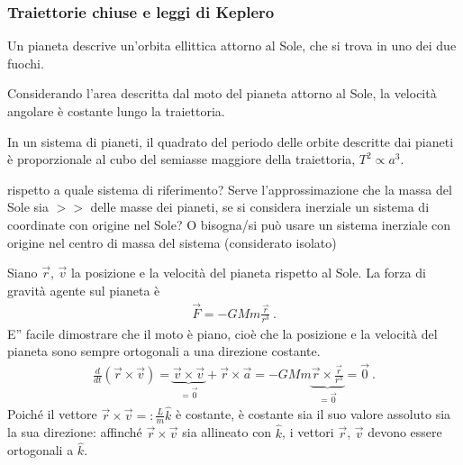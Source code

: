 \documentclass[letterpaper,10pt,italian]{jupyterBook}
\begin{document}
\subsubsection{Traiettorie chiuse e leggi di Keplero}
\label{\detokenize{ch/mechanics/dynamics-motion-gravitation:traiettorie-chiuse-e-leggi-di-keplero}}
\sphinxAtStartPar
{} Un pianeta descrive un’orbita ellittica attorno al Sole, che si trova in uno dei due fuochi.

\sphinxAtStartPar
{} Considerando l’area descritta dal moto del pianeta attorno al Sole, la velocità angolare è costante lungo la traiettoria.

\sphinxAtStartPar
{} In un sistema di pianeti, il quadrato del periodo delle orbite descritte dai pianeti è proporzionale al cubo del semiasse maggiore della traiettoria, \(T^2 \propto a^3\).

\sphinxAtStartPar
{} rispetto a quale sistema di riferimento? Serve l’approssimazione che la massa del Sole sia \(>>\) delle masse dei pianeti, se si considera inerziale un sistema di coordinate con origine nel Sole? O bisogna/si può usare un sistema inerziale con origine nel centro di massa del sistema (considerato isolato)

\sphinxAtStartPar
{} Siano \(\vec{r}\), \(\vec{v}\) la posizione e la velocità del pianeta rispetto al Sole. La forza di gravità agente sul pianeta è
\begin{equation*}
\begin{split}\vec{F} = - G M m \frac{\vec{r}}{r^3} \ .\end{split}
\end{equation*}
\sphinxAtStartPar
E” facile dimostrare che il moto è piano, cioè che la posizione e la velocità del pianeta sono sempre ortogonali a una direzione costante.
\begin{equation*}
\begin{split}\frac{d}{dt} \left( \vec{r} \times \vec{v} \right) = \underbrace{\vec{v} \times \vec{v}}_{=\vec{0}} + \vec{r} \times \vec{a}  = - G M m \underbrace{\vec{r} \times \frac{\vec{r}}{r^3}}_{=\vec{0}} = \vec{0} \ .\end{split}
\end{equation*}
\sphinxAtStartPar
Poiché il vettore \(\vec{r} \times \vec{v} =: \frac{L}{m} \hat{k}\) è costante, è costante sia il suo valore assoluto sia la sua direzione: affinché \(\vec{r} \times \vec{v}\) sia allineato con \(\hat{k}\), i vettori \(\vec{r}\), \(\vec{v}\) devono essere ortogonali a \(\hat{k}\).
\end{document}
